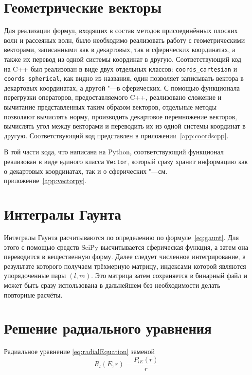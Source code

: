 \section{\textbf{Геометрические векторы}}\label{sec:programming/vectors}
Для реализации формул, входящих в состав методов присоединённых плоских волн и рассеяных волн, было необходимо
реализовать работу с геометрическими векторами, записанными как в декартовых, так и сферических координатах, а также
их перевод из одной системы координат в другую. Соответствующий код на C++ был реализован в виде двух отдельных
классов: \texttt{coords\_cartesian} и \texttt{coords\_spherical}, как видно из названия, один позволяет записывать вектора
в декартовых координатах, а другой "---в сферических. С помощью функционала перегрузки операторов, предоставляемого C++,
реализовано сложение и вычитание представленных таким образом векторов, отдельные методы позволяют вычислять норму,
производить декартовое перемножение векторов, вычислять угол между векторами и переводить их из одной системы координат
в другую. Соответствующий код представлен в приложении~\cref{app:coordscpp}.

В той части кода, что написана на Python, соответствующий функционал реализован в виде единого класса \texttt{Vector},
который сразу хранит информацию как о декартовых координатах, так и о сферических "---см. приложение~\cref{app:vectorpy}.

\section{\textbf{Интегралы Гаунта}}\label{sec:programming/gaunt}
Интегралы Гаунта расчитываются по определению по формуле~\eqref{eq:gaunt}. Для этого с помощью средств SciPy
высчитывается сферическая функция\cite{scipy-spherical}, а затем она переводится в вещественную форму\cite{whittaker2014course}.
Далее следует численное интегрирование\cite{scipy-dblquad}, в результате которого получаем трёхмерную матрицу, индексами
которой являются упорядоченные пары $(l, m)$. Это матрица затем сохраняется в бинарный файл\cite{numpy-save} и может быть
сразу использована в дальнейшем без необходимости делать повторные расчёты.

\section{\textbf{Решение радиального уравнения}}\label{sec:programming/numerov}
Радиальное уравнение \eqref{eq:radialEquation} заменой
\begin{equation}\label{eq:radialFunctionChange}
  R_l(E, r) = \frac{P_{l E}(r)}{r}
\end{equation}

